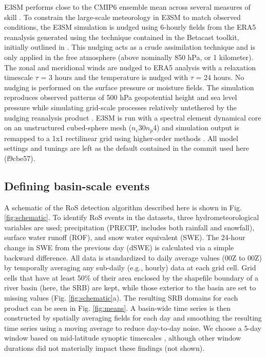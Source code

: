 \documentclass[nhess, manuscript]{copernicus}
\begin{document}
E3SM performs close to the CMIP6 ensemble mean across several measures of skill \citep{Fasullo2020}.
To constrain the large-scale meteorology in E3SM to match observed conditions, the E3SM simulation is nudged using 6-hourly fields from the ERA5 reanalysis \citep{hersbach2020era5} generated using the technique contained in the Betacast toolkit, initially outlined in \citet{zarzycki2015experimental}.
This nudging acts as a crude assimilation technique and is only applied in the free atmosphere (above nominally 850 hPa, or 1 kilometer). The zonal and meridional winds are nudged to ERA5 analysis with a relaxation timescale $\tau$ = 3 hours and the temperature is nudged with $\tau$ = 24 hours. No nudging is performed on the surface pressure or moisture fields.
The simulation reproduces observed patterns of 500 hPa geopotential height and sea level pressure while simulating grid-scale processes relatively untethered by the nudging reanalysis product \citep{sun2019impact}.
E3SM is run with a spectral element dynamical core on an unstructured cubed-sphere mesh ($n_e$30$n_p$4) and simulation output is remapped to a 1\degree{}x1\degree{} rectilinear grid using higher-order methods \citep{hill2004architecture}. All model settings and tunings are left as the default contained in the commit used here (f9cbe57).

\subsection{Defining basin-scale events}
\label{subsec:algo}

A schematic of the RoS detection algorithm described here is shown in Fig. \ref{fig:schematic}.
To identify RoS events in the datasets, three hydrometeorological variables are used; precipitation (PRECIP, includes both rainfall and snowfall), surface water runoff (ROF), and snow water equivalent (SWE).
The 24-hour change in SWE from the previous day (dSWE) is calculated via a simple backward difference.
All data is standardized to daily average values (00Z to 00Z) by temporally averaging any sub-daily (e.g., hourly) data at each grid cell.
Grid cells that have at least 50\% of their area enclosed by the shapefile boundary of a river basin (here, the SRB) are kept, while those exterior to the basin are set to missing values (Fig. \ref{fig:schematic}a).
The resulting SRB domains for each product can be seen in Fig. \ref{fig:means}.
A basin-wide time series is then constructed by spatially averaging fields for each day and smoothing the resulting time series using a moving average to reduce day-to-day noise.
We choose a 5-day window based on mid-latitude synoptic timescales \citep{holton2004introduction}, although other window durations did not materially impact these findings (not shown).
\end{document}
